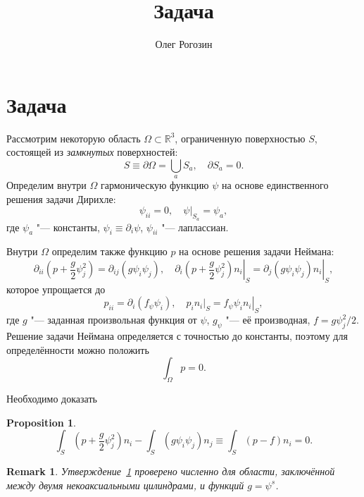 \documentclass{article}
\title{Задача}
\author{Олег Рогозин}
\newtheorem{proposition}{Proposition}
\newtheorem{remark}{Remark}
\begin{document}
\section{Задача}

Рассмотрим некоторую область \(\Omega\subset\mathbb{R}^3\), ограниченную поверхностью \(S\),
состоящей из \emph{замкнутых} поверхностей:
\begin{equation}\label{eq:domain_boundary}
    S \equiv \partial\Omega = \bigcup_a S_a, \quad \partial{S_a} = 0.
\end{equation}
Определим внутри \(\Omega\) гармоническую функцию \(\psi\) на основе единственного решения задачи Дирихле:
\begin{equation}\label{eq:psi_Dirichlet}
    \psi_{ii} = 0, \quad \psi|_{S_a} = \psi_a,
\end{equation}
где \(\psi_a\) "--- константы, \(\psi_i\equiv\partial_i\psi\), \(\psi_{ii}\) "--- лаплассиан.

Внутри \(\Omega\) определим также функцию \(p\) на основе решения задачи Неймана:
\begin{equation}\label{eq:p_Neumann}
    \partial_{ii}\left( p + \frac{g}2\psi_j^2 \right) = \partial_{ij}\left( g\psi_i\psi_j \right), \quad
    \left.\partial_i\left( p + \frac{g}2\psi_j^2 \right)n_i\right|_S =
    \left.\partial_j\left( g\psi_i\psi_j \right)n_i\right|_S,
\end{equation}
которое упрощается до
\begin{equation}\label{eq:p_Neumann2}
    p_{ii} = \partial_i\left( f_\psi \psi_i \right), \quad
    p_i n_i|_S = \left. f_\psi \psi_i n_i \right|_S,
\end{equation}
где \(g\) "--- заданная произвольная функция от \(\psi\), \(g_\psi\) "--- её производная, \(f=g\psi_j^2/2\).
Решение задачи Неймана определяется с точностью до константы, поэтому для определённости можно положить
\begin{equation}\label{eq:p_over_domain}
    \int_\Omega p = 0.
\end{equation}

Необходимо доказать
\begin{proposition}\label{prop:main}
\begin{equation}\label{eq:forces_sum}
    \int_S\left( p + \frac{g}2\psi_j^2\right)n_i - \int_S\left( g\psi_i\psi_j \right)n_j \equiv
    \int_S\left( p - f \right)n_i = 0.
\end{equation}
\end{proposition}

\begin{remark}
    Утверждение~\ref{prop:main} проверено численно для области, заключённой между двумя некоаксиальными цилиндрами,
    и функций \(g=\psi^s\).
\end{remark}
\end{document}
